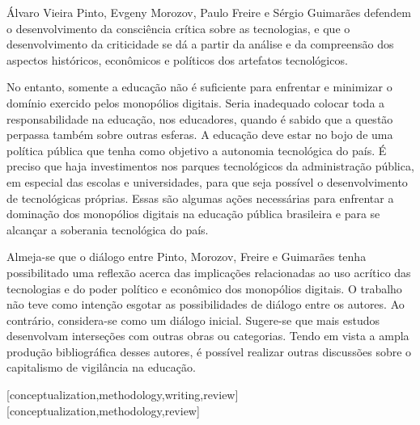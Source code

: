 \documentclass[portuguese]{textolivre}
\begin{document}
Álvaro Vieira Pinto, Evgeny Morozov, Paulo Freire e Sérgio Guimarães defendem o desenvolvimento da consciência crítica sobre as tecnologias, e que o desenvolvimento da criticidade se dá a partir da análise e da compreensão dos aspectos históricos, econômicos e políticos dos artefatos tecnológicos.

No entanto, somente a educação não é suficiente para enfrentar e minimizar o domínio exercido pelos monopólios digitais. Seria inadequado colocar toda a responsabilidade na educação, nos educadores, quando é sabido que a questão perpassa também sobre outras esferas. A educação deve estar no bojo de uma política pública que tenha como objetivo a autonomia tecnológica do país. É preciso que haja investimentos nos parques tecnológicos da administração pública, em especial das escolas e universidades, para que seja possível o desenvolvimento de tecnológicas próprias. Essas são algumas ações necessárias para enfrentar a dominação dos monopólios digitais na educação pública brasileira e para se alcançar a soberania tecnológica do país.

Almeja-se que o diálogo entre Pinto, Morozov, Freire e Guimarães tenha possibilitado uma reflexão acerca das implicações relacionadas ao uso acrítico das tecnologias e do poder político e econômico dos monopólios digitais. O trabalho não teve como intenção esgotar as possibilidades de diálogo entre os autores. Ao contrário, considera-se como um diálogo inicial. Sugere-se que mais estudos desenvolvam interseções com outras obras ou categorias. Tendo em vista a ampla produção bibliográfica desses autores, é possível realizar outras discussões sobre o capitalismo de vigilância na educação.

\printbibliography\label{sec-bib}


\begin{contributors}
[conceptualization,methodology,writing,review]
[conceptualization,methodology,review]
\end{contributors}
\end{document}
